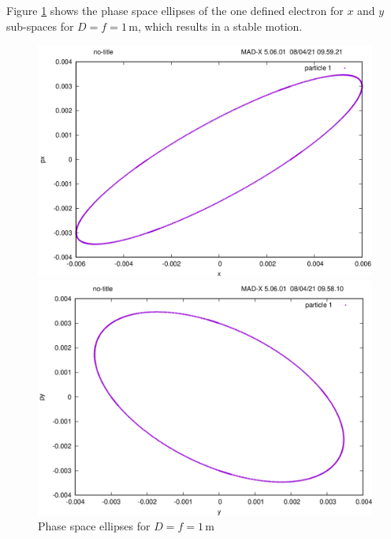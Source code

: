 Figure \ref{fig:ellipse} shows the phase space ellipses of the one defined electron for $x$ and $y$ sub-spaces for $D=f=1\,\mathrm{m}$, which results in a stable motion.

\begin{figure}[tbp]
    \centering
    \begin{minipage}{0.49\textwidth}
        \includegraphics[width=\textwidth]{../../part1/d1f1_x.png}
    \end{minipage}\hfill
    \begin{minipage}{0.49\textwidth}
        \centering
        \includegraphics[width=\textwidth]{../../part1/d1f1_y.png}
    \end{minipage}
    \caption{Phase space ellipses for $D=f=1\,\mathrm{m}$}
    \label{fig:ellipse}
\end{figure}

